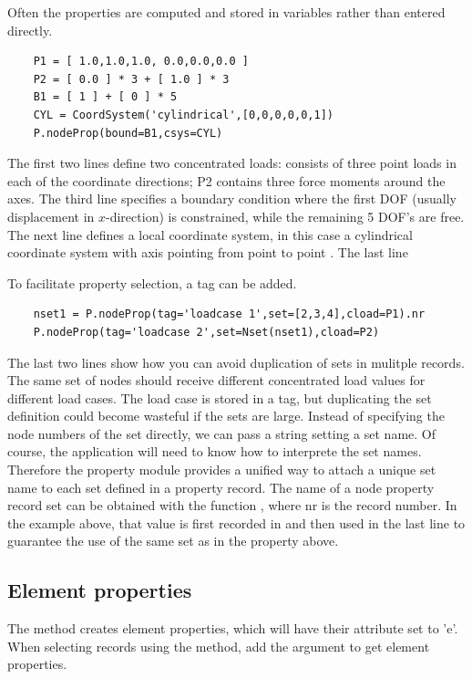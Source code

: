 {{{Often the properties are computed and stored in variables rather than entered directly.
\begin{verbatim}
    P1 = [ 1.0,1.0,1.0, 0.0,0.0,0.0 ]
    P2 = [ 0.0 ] * 3 + [ 1.0 ] * 3 
    B1 = [ 1 ] + [ 0 ] * 5
    CYL = CoordSystem('cylindrical',[0,0,0,0,0,1])
    P.nodeProp(bound=B1,csys=CYL)
\end{verbatim}
The first two lines define two concentrated loads:  consists of three point loads in each of the coordinate directions; P2 contains three force moments around the axes.
The third line specifies a boundary condition where the first DOF (usually displacement in $x$-direction) is constrained, while the remaining 5 DOF's are free.
The next line defines a local coordinate system, in this case a cylindrical coordinate system with axis pointing from point \code{[0.,0.,0.]} to point \code{[0.,0.,1.]}. The last line 

To facilitate property selection, a tag can be added.
\begin{verbatim}
    nset1 = P.nodeProp(tag='loadcase 1',set=[2,3,4],cload=P1).nr
    P.nodeProp(tag='loadcase 2',set=Nset(nset1),cload=P2)
\end{verbatim}
The last two lines show how you can avoid duplication of sets in mulitple records. The same set of nodes should receive different concentrated load values for different load cases. The load case is stored in a tag, but duplicating the set definition could become wasteful if the sets are large. Instead of specifying the node numbers of the set directly, we can pass a string setting a set name.
Of course, the application will need to know how to interprete the set names.
Therefore the property module provides a unified way to attach a unique set name to each set defined in a property record. The name of a node property record set can be obtained with the function , where nr is the record number. In the example above, that value is first recorded in  and then used in the last line to guarantee the use of the same set as in the property above.


\subsection{Element properties}
\label{sec:elem-properties}


The  method creates element properties, which will have their  attribute set to 'e'. When selecting records using the  method, add the  argument to get element properties.

}}}
